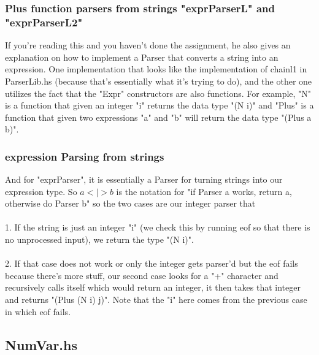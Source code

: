 \documentclass[12pt]{article}
\begin{document}
\subsubsection{Plus function parsers from strings "exprParserL" and "exprParserL2"}

If you're reading this and you haven't done the assignment, he also gives an explanation on how to implement a Parser that converts a string into an expression. One implementation that looks like the implementation of chainl1 in ParserLib.hs (because that's essentially what it's trying to do), and the other one utilizes the fact that the "Expr" constructors are also functions. For example, "N" is a function that given an integer "i" returns the data type "(N i)" and "Plus" is a function that given two expressions "a" and "b" will return the data type "(Plus a b)".

\subsubsection{expression Parsing from strings}

And for "exprParser", it is essentially a Parser for turning strings into our expression type. So $a <|> b$ is the notation for "if Parser a works, return a, otherwise do Parser b" so the two cases are our integer parser that\\
\\
1. If the string is just an integer "i" (we check this by running eof so that there is no unprocessed input), we return the type "(N i)".\\
\\
2. If that case does not work or only the integer gets parser'd but the eof fails because there's more stuff, our second case looks for a "+" character and recursively calls itself which would return an integer, it then takes that integer and returns "(Plus (N i) j)". Note that the "i" here comes from the previous case in which eof fails.

\newpage

\subsection{NumVar.hs}
\end{document}
